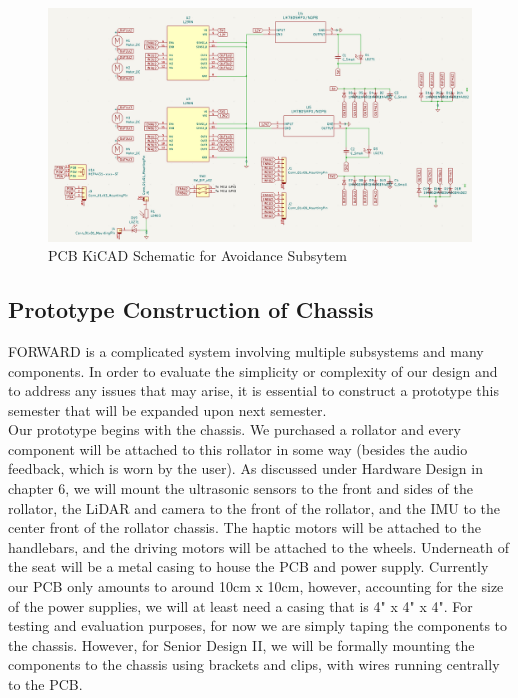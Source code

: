 \begin{figure}[H]
	\centering
	\includegraphics[width=\textwidth]{./Images/pcb-avoidance-headers2.png}
	\caption{\label{fig:pcb-motor}PCB KiCAD Schematic for Avoidance Subsytem}
\end{figure}

\subsection{Prototype Construction of Chassis}
\noindent FORWARD is a complicated system involving multiple subsystems and many components. In order to evaluate the simplicity or complexity of our design and to address any issues that may arise, it is essential to construct a prototype this semester that will be expanded upon next semester.\\

\noindent Our prototype begins with the chassis. We purchased a rollator and every component will be attached to this rollator in some way (besides the audio feedback, which is worn by the user). As discussed under Hardware Design in chapter 6, we will mount the ultrasonic sensors to the front and sides of the rollator, the LiDAR and camera to the front of the rollator, and the IMU to the center front of the rollator chassis. The haptic motors will be attached to the handlebars, and the driving motors will be attached to the wheels. Underneath of the seat will be a metal casing to house the PCB and power supply. Currently our PCB only amounts to around 10cm x 10cm, however, accounting for the size of the power supplies, we will at least need a casing that is 4" x 4" x 4". For testing and evaluation purposes, for now we are simply taping the components to the chassis. However, for Senior Design II, we will be formally mounting the components to the chassis using brackets and clips, with wires running centrally to the PCB.\\